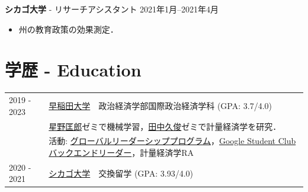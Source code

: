\documentclass[uplatex,dvipdfmx,a4paper,11pt]{jsarticle}
\begin{document}

{ \bf\textcolor{blue(pigment)}{シカゴ大学}} { - リサーチアシスタント} \hfill {2021年1月--2021年4月} 
\begin{itemize}
\item 州の教育政策の効果測定．
\end{itemize}

\section{学歴 - Education}
\begin{tabularx}{\linewidth}{@{}l X@{}}	
2019 - 2023 & \uline{早稲田大学}　政治経済学部国際政治経済学科 \hfill \normalsize (GPA: 3.7/4.0) \\
&  \href{https://tadaohoshino.wordpress.com/}{星野匡郎}ゼミで機械学習，\href{https://waseda.pure.elsevier.com/en/persons/hisatoshi-tanaka}{田中久俊}ゼミで計量経済学を研究．\\
& 活動: \href{http://www2.cie-waseda.jp/glfp/jp/about/program.html}{グローバルリーダーシッププログラム}，\href{https://gdsc.community.dev/waseda-university/}{Google Student Club バックエンドリーダー}，計量経済学RA\\
2020 - 2021 & \uline{シカゴ大学}　交換留学 \hfill (GPA: 3.93/4.0) \\
\end{tabularx}


\end{document}
